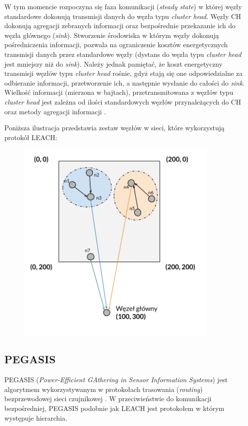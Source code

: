 \documentclass[a4paper,12pt,twoside,openany]{report}
\begin{document}
W tym momencie rozpoczyna się faza komunikacji (\textit{steady state}) w której węzły standardowe dokonują transmisji danych do  węzła typu \textit{cluster head}.
Węzły CH dokonują agregacji zebranych informacji oraz bezpośrednie przekazanie ich do węzła głównego (\textit{sink}).
Stworzenie środowiska w którym węzły dokonują pośredniczenia informacji, pozwala na ograniczenie kosztów energetycznych transmisji danych przez
standardowe węzły (dystans do węzła typu \textit{cluster head} jest mniejszy niż do \textit{sink}). Należy jednak pamiętać, że koszt energetyczny transmisji węzłów typu \textit{cluster head}
rośnie, gdyż stają się one odpowiedzialne za odbieranie informacji, przetworzenie ich, a następnie wysłanie do całości do \textit{sink}. Wielkość informacji (mierzona w bajtach), przetransmitowana 
z węzłów typu \textit{cluster head} jest zależna od ilości standardowych węzłów przynależących do CH oraz metody agregacji informacji \cite{pega-aggregacja} \cite{pega-compression}.

Poniższa ilustracja przedstawia zestaw węzłów w sieci, które wykorzystują protokół LEACH:

\begin{figure}[H]
 \centering
 \includegraphics[width=10cm]{images/komunikacja_leach.png} 
\end{figure}

\subsection{PEGASIS}

PEGASIS (\textit{Power-Efficient GAthering in Sensor Information Systems}) jest algorytmem wykorzystywanym w protokołach trasowania (\textit{routing}) bezprzewodowej sieci czujnikowej \cite{Lindsey-Pegasis}.
W przeciwieństwie do komunikacji bezpośredniej, PEGASIS podobnie jak LEACH jest protokołem w którym występuje hierarchia.
\end{document}
